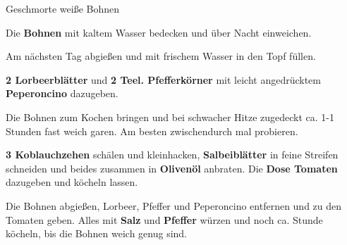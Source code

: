 \begin{recipe}[]{Geschmorte weiße Bohnen} %
	\personcount{} %


\step
Die \textbf{Bohnen} mit kaltem Wasser bedecken und über Nacht einweichen. 

\step
Am nächsten Tag abgießen und mit frischem Wasser in den Topf füllen.

\step
\textbf{2 Lorbeerblätter} und \textbf{2 Teel. Pfefferkörner} mit leicht angedrücktem \textbf{Peperoncino} dazugeben. 

\step
Die Bohnen zum Kochen bringen und bei schwacher Hitze zugedeckt ca. 1-1 Stunden fast weich garen. Am besten zwischendurch mal probieren.

\step
\textbf{3 Koblauchzehen} schälen und kleinhacken, \textbf{Salbeiblätter} in feine Streifen schneiden und beides zusammen in \textbf{Olivenöl} anbraten. Die \textbf{Dose Tomaten} dazugeben und köcheln lassen. 

\step
Die Bohnen abgießen, Lorbeer, Pfeffer und Peperoncino entfernen und zu den Tomaten geben. 
Alles mit \textbf{Salz} und \textbf{Pfeffer} würzen und noch ca.  Stunde köcheln, bis die Bohnen weich genug sind.

\end{recipe}